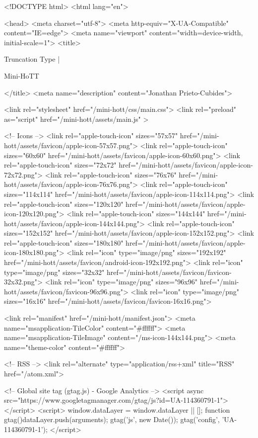 <!DOCTYPE html>
<html lang="en">

<head>
  <meta charset="utf-8">
  <meta http-equiv="X-UA-Compatible" content="IE=edge">
  <meta name="viewport" content="width=device-width, initial-scale=1">
  <title>
    
      
        Truncation Type |
      
        Mini-HoTT
    
  </title>
  <meta name="description" content="Jonathan Prieto-Cubides">

  <link rel="stylesheet" href="/mini-hott/css/main.css">
  <link rel="preload" as="script" href="/mini-hott/assets/main.js" >

  <!-- Icons -->
  <link rel="apple-touch-icon" sizes="57x57" href="/mini-hott/assets/favicon/apple-icon-57x57.png">
  <link rel="apple-touch-icon" sizes="60x60" href="/mini-hott/assets/favicon/apple-icon-60x60.png">
  <link rel="apple-touch-icon" sizes="72x72" href="/mini-hott/assets/favicon/apple-icon-72x72.png">
  <link rel="apple-touch-icon" sizes="76x76" href="/mini-hott/assets/favicon/apple-icon-76x76.png">
  <link rel="apple-touch-icon" sizes="114x114" href="/mini-hott/assets/favicon/apple-icon-114x114.png">
  <link rel="apple-touch-icon" sizes="120x120" href="/mini-hott/assets/favicon/apple-icon-120x120.png">
  <link rel="apple-touch-icon" sizes="144x144" href="/mini-hott/assets/favicon/apple-icon-144x144.png">
  <link rel="apple-touch-icon" sizes="152x152" href="/mini-hott/assets/favicon/apple-icon-152x152.png">
  <link rel="apple-touch-icon" sizes="180x180" href="/mini-hott/assets/favicon/apple-icon-180x180.png">
  <link rel="icon" type="image/png" sizes="192x192"  href="/mini-hott/assets/favicon/android-icon-192x192.png">
  <link rel="icon" type="image/png" sizes="32x32" href="/mini-hott/assets/favicon/favicon-32x32.png">
  <link rel="icon" type="image/png" sizes="96x96" href="/mini-hott/assets/favicon/favicon-96x96.png">
  <link rel="icon" type="image/png" sizes="16x16" href="/mini-hott/assets/favicon/favicon-16x16.png">

  <link rel="manifest" href="/mini-hott/manifest.json">
  <meta name="msapplication-TileColor" content="#ffffff">
  <meta name="msapplication-TileImage" content="/ms-icon-144x144.png">
  <meta name="theme-color" content="#ffffff">

  <!-- RSS -->
  <link rel="alternate" type="application/rss+xml" title="RSS" href="/atom.xml">

  <!-- Global site tag (gtag.js) - Google Analytics -->
  <script async src="https://www.googletagmanager.com/gtag/js?id=UA-114360791-1"></script>
  <script>
    window.dataLayer = window.dataLayer || [];
    function gtag(){dataLayer.push(arguments);}
    gtag('js', new Date());
    gtag('config', 'UA-114360791-1');
  </script>

